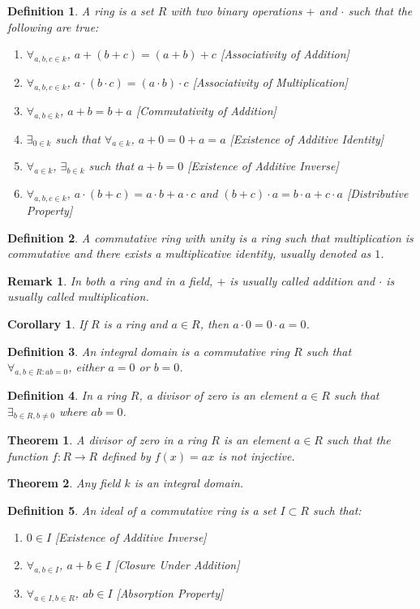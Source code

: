 \documentclass[oneside]{book}
\theoremstyle{mystyle}
\newtheorem{theorem}{Theorem}[section]
\newtheorem{definition}{Definition}[section]
\newtheorem{corollary}{Corollary}[section]
\newtheorem{remark}{Remark}[section]
\begin{document}
\begin{definition}
A ring is a set $R$ with two binary operations $+$ and $\cdot$ such that the following are true:
\begin{enumerate}
    \item $\forall_{a,b,c\in k}$, $a+(b+c)=(a+b)+c$ \hfill [Associativity of Addition]
    \item $\forall_{a,b,c\in k}$, $a\cdot(b\cdot c) = (a\cdot b)\cdot c$ \hfill [Associativity of Multiplication]
    \item $\forall_{a,b\in k}$, $a+b=b+a$ \hfill [Commutativity of Addition]
    \item $\exists_{0 \in k}$ such that $\forall_{a\in k}$, $a+0=0+a = a$ \hfill [Existence of Additive Identity]
    \item $\forall_{a\in k}$, $\exists_{b\in k}$ such that $a+b=0$ \hfill [Existence of Additive Inverse]
    \item $\forall_{a,b,c\in k}$, $a\cdot(b+c) = a\cdot b + a\cdot c$ and $(b+c)\cdot a = b\cdot a + c\cdot a$ \hfill [Distributive Property]
\end{enumerate}
\end{definition}
\begin{definition}
A commutative ring with unity is a ring such that multiplication is commutative and there exists a multiplicative identity, usually denoted as $1$.
\end{definition}
\begin{remark}
In both a ring and in a field, $+$ is usually called addition and $\cdot$ is usually called multiplication.
\end{remark}
\begin{corollary}
If $R$ is a ring and $a\in R$, then $a\cdot 0 = 0\cdot a = 0$.
\end{corollary}
\begin{definition}
An integral domain is a commutative ring $R$ such that $\forall_{a,b\in R:ab=0}$, either $a=0$ or $b=0$.
\end{definition}
\begin{definition}
In a ring $R$, a divisor of zero is an element $a\in R$ such that $\exists_{b\in R,b\ne 0}$ where $ab=0$.
\end{definition}
\begin{theorem}
A divisor of zero in a ring $R$ is an element $a\in R$ such that the function $f:R\rightarrow R$ defined by $f(x) = ax$ is not injective.
\end{theorem}
\begin{theorem}
Any field $k$ is an integral domain.
\end{theorem}
\begin{definition}
An ideal of a commutative ring is a set $I\subset R$ such that:
\begin{enumerate}
    \item $0\in I$ \hfill [Existence of Additive Inverse]
    \item $\forall_{a,b\in I}$, $a+b\in I$ \hfill [Closure Under Addition]
    \item $\forall_{a\in I,b\in R}$, $a b \in I$ \hfill [Absorption Property]
\end{enumerate}
\end{definition}
\end{document}
